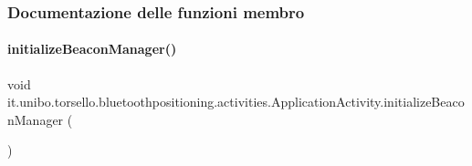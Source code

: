 \subsubsection{Documentazione delle funzioni membro}
\hypertarget{classit_1_1unibo_1_1torsello_1_1bluetoothpositioning_1_1activities_1_1ApplicationActivity_a55d4f45ce163b9f613420686f6dfe1cf_a55d4f45ce163b9f613420686f6dfe1cf}{}\label{classit_1_1unibo_1_1torsello_1_1bluetoothpositioning_1_1activities_1_1ApplicationActivity_a55d4f45ce163b9f613420686f6dfe1cf_a55d4f45ce163b9f613420686f6dfe1cf} 
\paragraph{\texorpdfstring{initialize\+Beacon\+Manager()}{initializeBeaconManager()}}
{\footnotesize\ttfamily void it.\+unibo.\+torsello.\+bluetoothpositioning.\+activities.\+Application\+Activity.\+initialize\+Beacon\+Manager (\begin{DoxyParamCaption}{ }\end{DoxyParamCaption})\hspace{0.3cm}{\ttfamily [private]}}


